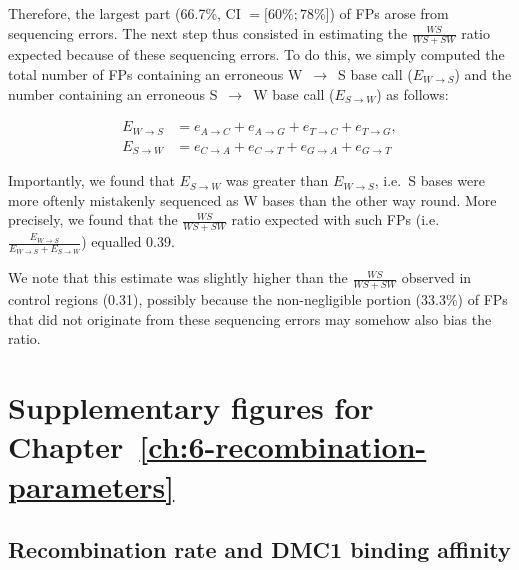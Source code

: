 Therefore, the largest part (66.7\%, CI $= [60\%; 78\%$]) of FPs arose from sequencing errors.
The next step thus consisted in estimating the $\frac{WS}{WS+SW}$ ratio expected because of these sequencing errors.
To do this, we simply computed the total number of FPs containing an erroneous W~$\rightarrow$~S base call ($E_{W\rightarrow S}$) and the number containing an erroneous S~$\rightarrow$~W base call ($E_{S\rightarrow W}$) as follows:

\begin{align}
        E_{W\rightarrow S}&= e_{A\rightarrow C} + e_{A\rightarrow G} + e_{T\rightarrow C} + e_{T\rightarrow G}, \\
        E_{S\rightarrow W}&= e_{C\rightarrow A} + e_{C\rightarrow T} + e_{G\rightarrow A} + e_{G\rightarrow T}
\end{align}

Importantly, we found that $E_{S\rightarrow W}$ was greater than $E_{W\rightarrow S}$, i.e.\ S bases were more oftenly mistakenly sequenced as W bases than the other way round.
More precisely, we found that the $\frac{WS}{WS+SW}$ ratio expected with such FPs (i.e.\ $\frac{E_{W\rightarrow S}}{E_{W\rightarrow S} + E_{S\rightarrow W}}$) equalled 0.39.

We note that this estimate was slightly higher than the $\frac{WS}{WS+SW}$ observed in control regions (0.31), possibly because the non-negligible portion (33.3\%) of FPs that did not originate from these sequencing errors may somehow also bias the ratio.









%
%



\hypersetup{linkcolor=titlepagecolorsection}
\section{Supplementary figures for Chapter~\ref{ch:6-recombination-parameters}}
\hypersetup{linkcolor=black}

\subsection{Recombination rate and DMC1 binding affinity}

